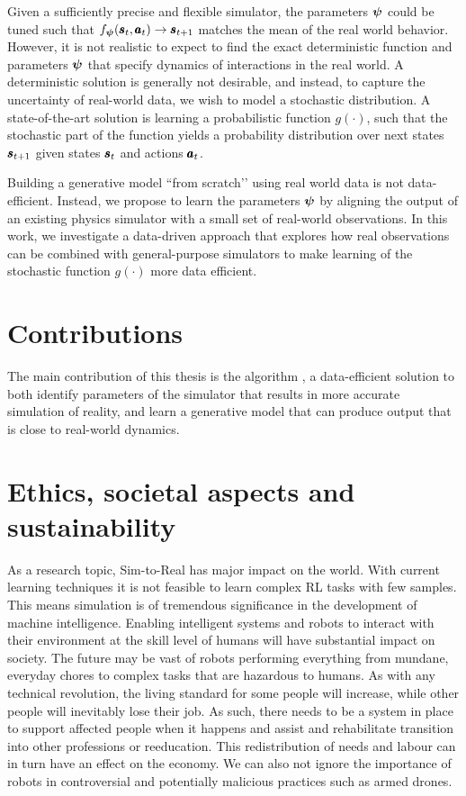 Given a sufficiently precise and flexible simulator, the parameters $\boldsymbol{\psi}$ could be tuned such that $f_{\boldsymbol{\psi}}(\pmb{s}_t, \pmb{a}_t) \rightarrow \pmb{s}_{t+1}$ matches the mean of the real world behavior. However, it is not realistic to expect to find the exact deterministic function and parameters $\boldsymbol{\psi}$ that specify dynamics of interactions in the real world. A deterministic solution is generally not desirable, and instead, to capture the uncertainty of real-world data, we wish to model a stochastic distribution. A state-of-the-art solution is learning a probabilistic function $g(\cdot)$, such that the stochastic part of the function yields a probability distribution over next states $\pmb{s}_{t+1}$ given states $\pmb{s}_t$ and actions $\pmb{a}_t$.

Building a generative model ``from scratch’' using real world data is not data-efficient. Instead, we propose to learn the parameters $\boldsymbol{\psi}$ by aligning the output of an existing physics simulator with a small set of real-world observations. In this work, we investigate a data-driven approach that explores how real observations can be combined with general-purpose simulators to make learning of the stochastic function $g(\cdot)$ more data efficient.

\section{Contributions}

The main contribution of this thesis is the algorithm \dettostoc{}, a data-efficient solution to both identify parameters of the simulator that results in more accurate simulation of reality, and learn a generative model that can produce output that is close to real-world dynamics.

\section{Ethics, societal aspects and sustainability}

As a research topic, Sim-to-Real has major impact on the world. With current learning techniques it is not feasible to learn complex RL tasks with few samples. This means simulation is of tremendous significance in the development of machine intelligence. Enabling intelligent systems and robots to interact with their environment at the skill level of humans will have substantial impact on society. The future may be vast of robots performing everything from mundane, everyday chores to complex tasks that are hazardous to humans. As with any technical revolution, the living standard for some people will increase, while other people will inevitably lose their job. As such, there needs to be a system in place to support affected people when it happens and assist and rehabilitate transition into other professions or reeducation. This redistribution of needs and labour can in turn have an effect on the economy. We can also not ignore the importance of robots in controversial and potentially malicious practices such as armed drones.

